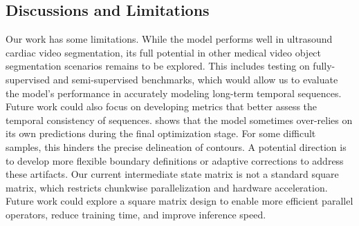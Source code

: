 \subsection{Discussions and Limitations}
    \label{subsec:discussion}
Our work has some limitations. 
While the model performs well in ultrasound cardiac video segmentation, its full potential in other medical video object segmentation scenarios remains to be explored. This includes testing on fully-supervised and semi-supervised benchmarks, which would allow us to evaluate the model's performance in accurately modeling long-term temporal sequences. Future work could also focus on developing metrics that better assess the temporal consistency of sequences.
 shows that the model sometimes over-relies on its own predictions during the final optimization stage. For some difficult samples, this hinders the precise delineation of contours. A potential direction is to develop more flexible boundary definitions or adaptive corrections to address these artifacts.
Our current intermediate state matrix is not a standard square matrix, which restricts chunkwise parallelization and hardware acceleration. Future work could explore a square matrix design to enable more efficient parallel operators, reduce training time, and improve inference speed.